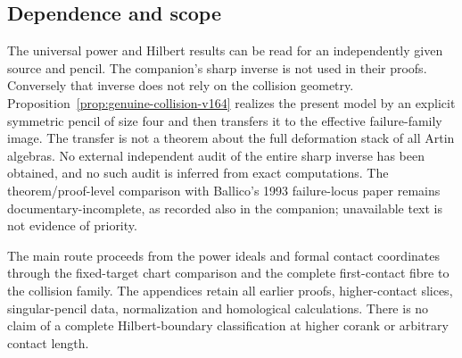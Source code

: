 \documentclass[11pt,reqno]{amsart}
\numberwithin{equation}{section}
\theoremstyle{definition}\newtheorem{definition}[theorem]{Definition}
\theoremstyle{remark}\newtheorem{remark}[theorem]{Remark}
\begin{document}
\subsection{Dependence and scope}
The universal power and Hilbert results can be read for an independently
given source and pencil. The companion's sharp inverse is not used
in their proofs. Conversely that inverse does not rely on the
collision geometry. Proposition~\ref{prop:genuine-collision-v164}
realizes the present model by an explicit symmetric pencil of size
four and then transfers it to the effective failure-family image.
The transfer is not a theorem about the full deformation stack of
all Artin algebras. No external independent audit of the entire sharp
inverse has been obtained, and no such audit is inferred from exact
computations. The theorem/proof-level comparison with Ballico's
1993 failure-locus paper remains documentary-incomplete, as recorded
also in the companion; unavailable text is not evidence of priority.

The main route proceeds from the power ideals and formal contact
coordinates through the fixed-target chart comparison and the
complete first-contact fibre to the collision family. The appendices
retain all earlier proofs, higher-contact slices, singular-pencil
data, normalization and homological calculations. There is no claim
of a complete Hilbert-boundary classification at higher corank or
arbitrary contact length.
\end{document}
